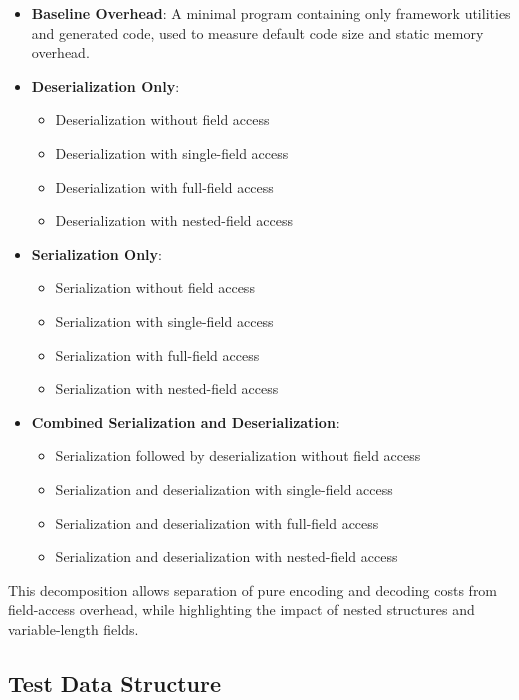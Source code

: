 \documentclass[11pt, a4paper]{article}
\begin{document}
\begin{itemize}
    \item \textbf{Baseline Overhead}: A minimal program containing only framework utilities and generated code, used to measure default code size and static memory overhead.

    \item \textbf{Deserialization Only}:
    \begin{itemize}
        \item Deserialization without field access
        \item Deserialization with single-field access
        \item Deserialization with full-field access
        \item Deserialization with nested-field access
    \end{itemize}

    \item \textbf{Serialization Only}:
    \begin{itemize}
        \item Serialization without field access
        \item Serialization with single-field access
        \item Serialization with full-field access
        \item Serialization with nested-field access
    \end{itemize}

    \item \textbf{Combined Serialization and Deserialization}:
    \begin{itemize}
        \item Serialization followed by deserialization without field access
        \item Serialization and deserialization with single-field access
        \item Serialization and deserialization with full-field access
        \item Serialization and deserialization with nested-field access
    \end{itemize}
\end{itemize}

This decomposition allows separation of pure encoding and decoding costs from field-access overhead, while highlighting the impact of nested structures and variable-length fields.

\subsection{Test Data Structure}
\end{document}

